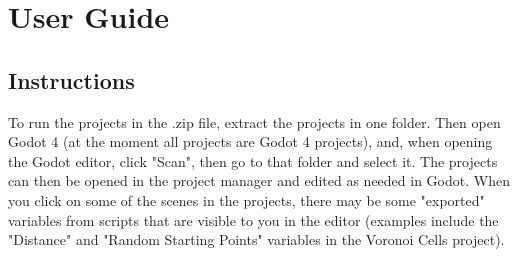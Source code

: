 \chapter{User Guide} \label{Guide}
\section{Instructions}

To run the projects in the .zip file, extract the projects in one folder. Then open Godot 4 (at the moment all projects are Godot 4 projects), and, when opening the Godot editor, click "Scan", then go to that folder and select it. The projects can then be opened in the project manager and edited as needed in Godot. When you click on some of the scenes in the projects, there may be some "exported" variables from scripts that are visible to you in the editor (examples include the "Distance" and "Random Starting Points" variables in the Voronoi Cells project).
